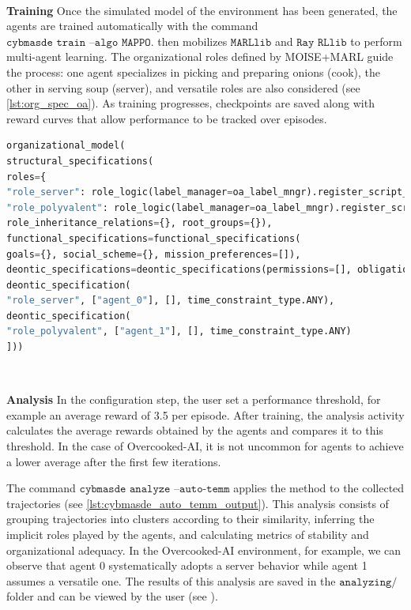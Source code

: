 \

\noindent
\textbf{Training} \quad
Once the simulated model of the environment has been generated, the agents are trained automatically with the command $\texttt{cybmasde train --algo MAPPO}$.  then mobilizes $\texttt{MARLlib}$ and $\texttt{Ray RLlib}$ to perform multi-agent learning. The organizational roles defined by MOISE+MARL guide the process: one agent specializes in picking and preparing onions (cook), the other in serving soup (server), and versatile roles are also considered (see \autoref{lst:org_spec_oa}). As training progresses, checkpoints are saved along with reward curves that allow performance to be tracked over episodes.

\begin{lstlisting}[language=Python,basicstyle=\scriptsize, label={lst:org_spec_oa}, caption={Excerpt from the organizational configuration file for Overcooked-AI}]
organizational_model(
structural_specifications(
roles={
"role_server": role_logic(label_manager=oa_label_mngr).register_script_rule(primary_fun),
"role_polyvalent": role_logic(label_manager=oa_label_mngr).register_script_rule(secondary_fun)},
role_inheritance_relations={}, root_groups={}),
functional_specifications=functional_specifications(
goals={}, social_scheme={}, mission_preferences=[]),
deontic_specifications=deontic_specifications(permissions=[], obligations=[
deontic_specification(
"role_server", ["agent_0"], [], time_constraint_type.ANY),
deontic_specification(
"role_polyvalent", ["agent_1"], [], time_constraint_type.ANY)
]))
\end{lstlisting}

\

\textbf{Analysis} \quad
In the configuration step, the user set a performance threshold, for example an average reward of 3.5 per episode. After training, the  analysis activity calculates the average rewards obtained by the agents and compares it to this threshold. In the case of Overcooked-AI, it is not uncommon for agents to achieve a lower average after the first few iterations.

The command $\texttt{cybmasde analyze --auto-temm}$ applies the  method to the collected trajectories (see \autoref{lst:cybmasde_auto_temm_output}). This analysis consists of grouping trajectories into clusters according to their similarity, inferring the implicit roles played by the agents, and calculating metrics of stability and organizational adequacy. In the Overcooked-AI environment, for example, we can observe that agent 0 systematically adopts a server behavior while agent 1 assumes a versatile one. The results of this analysis are saved in the $\texttt{analyzing/ }$ folder and can be viewed by the user (see \autocite{lst:cybmasde_auto_temm_spec_output}).


